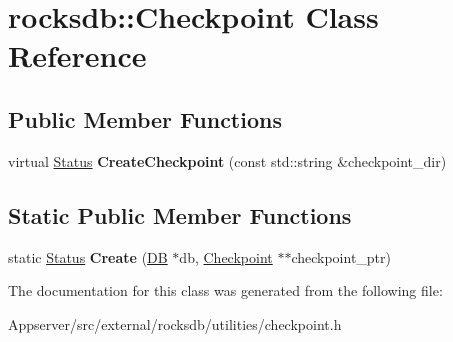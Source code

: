 \hypertarget{classrocksdb_1_1Checkpoint}{}\section{rocksdb\+:\+:Checkpoint Class Reference}
\label{classrocksdb_1_1Checkpoint}
\subsection*{Public Member Functions}
\begin{DoxyCompactItemize}
\item 
virtual \hyperlink{classrocksdb_1_1Status}{Status} {\bfseries Create\+Checkpoint} (const std\+::string \&checkpoint\+\_\+dir)\hypertarget{classrocksdb_1_1Checkpoint_ac635f7a56467bce415edeac6faafd25b}{}\label{classrocksdb_1_1Checkpoint_ac635f7a56467bce415edeac6faafd25b}

\end{DoxyCompactItemize}
\subsection*{Static Public Member Functions}
\begin{DoxyCompactItemize}
\item 
static \hyperlink{classrocksdb_1_1Status}{Status} {\bfseries Create} (\hyperlink{classrocksdb_1_1DB}{DB} $\ast$db, \hyperlink{classrocksdb_1_1Checkpoint}{Checkpoint} $\ast$$\ast$checkpoint\+\_\+ptr)\hypertarget{classrocksdb_1_1Checkpoint_a063a95e7832b0faa2e54e92ade9b0123}{}\label{classrocksdb_1_1Checkpoint_a063a95e7832b0faa2e54e92ade9b0123}

\end{DoxyCompactItemize}


The documentation for this class was generated from the following file\+:\begin{DoxyCompactItemize}
\item 
Appserver/src/external/rocksdb/utilities/checkpoint.\+h\end{DoxyCompactItemize}
